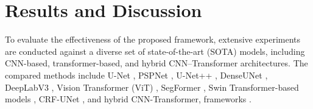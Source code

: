 \documentclass[pdflatex,sn-mathphys-num]{sn-jnl}
\begin{document}



\section{Results and Discussion}
To evaluate the effectiveness of the proposed framework, extensive experiments are conducted against a diverse set of state-of-the-art (SOTA) models, including CNN-based, transformer-based, and hybrid CNN--Transformer architectures. The compared methods include U-Net \cite{ronneberger2015unet}, PSPNet \cite{zhao2017pyramid}, U-Net++ \cite{zhou2018unet++}, DenseUNet \cite{mu2023densenet}, DeepLabV3 \cite{chen2018Deeplabv3plus}, Vision Transformer (ViT) \cite{dosovitskiy2021vit}, SegFormer \cite{xie2021segformer}, Swin Transformer-based models \cite{liu2021swin}, CRF-UNet \cite{sahin2023segmentation}, and hybrid CNN-Transformer, frameworks \cite{guo2025cnn_transformer}.
\end{document}
